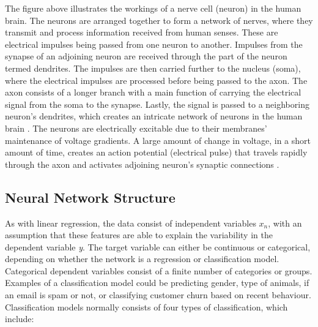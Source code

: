 \indent\newline   
The figure above illustrates the workings of a nerve cell (neuron) in the human brain. The neurons are arranged together to form a network of nerves, where they transmit and process information received from human senses. These are electrical impulses being passed from one neuron to another. Impulses from the synapse of an adjoining neuron are received through the part of the neuron termed dendrites. The impulses are then carried further to the nucleus (soma), where the electrical impulses are processed before being passed to the axon. The axon consists of a longer branch with a main function of carrying the electrical signal from the soma to the synapse. Lastly, the signal is passed to a neighboring neuron's dendrites, which creates an intricate network of neurons in the human brain \cite{panchal}.  The neurons are electrically excitable due to their membranes' maintenance of voltage gradients. A large amount of change in voltage, in a short amount of time, creates an action potential (electrical pulse) that travels rapidly through the axon and activates adjoining neuron's synaptic connections \cite{opper}.    

\subsection{Neural Network Structure}
As with linear regression, the data consist of independent variables \textit{$x_{n}$}, with an assumption that these features are able to explain the variability in the dependent variable \textit{y}. The target variable can either be continuous or categorical, depending on whether the network is a regression or classification model. Categorical dependent variables consist of a finite number of categories or groups. Examples of a classification model could be predicting gender, type of animals, if an email is spam or not, or classifying customer churn based on recent behaviour. Classification models normally consists of four types of classification, which include:

